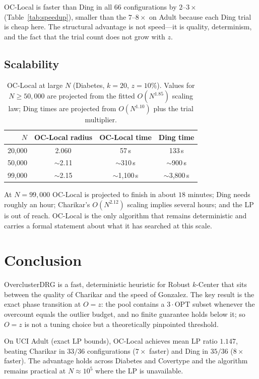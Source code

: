 \documentclass[twoside,leqno,twocolumn]{article}
\newcommand{\OPT}{\mathrm{OPT}}
\begin{document}
OC-Local is faster than Ding in all $66$ configurations by $2$--$3\times$
(Table~\ref{tab:speedup}), smaller than the $7$--$8\times$ on Adult
because each Ding trial is cheap here. The structural advantage is not
speed---it is quality, determinism, and the fact that the trial count
does not grow with $z$.

\subsection{Scalability}
\label{sec:scalability}

\begin{table}[t]
\caption{OC-Local at large $N$ (Diabetes, $k=20$, $z=10\%$).
Values for $N\ge50{,}000$ are projected from the fitted $O(N^{1.85})$
scaling law; Ding times are projected from $O(N^{1.10})$ plus the
trial multiplier.}
\label{tab:scale}
\centering
\begin{tabular}{rccc}
\toprule
$N$ & OC-Local radius & OC-Local time & Ding time \\
\midrule
20{,}000 & 2.060 & 57\,s  & 133\,s \\
50{,}000 & $\sim$2.11 & $\sim$310\,s & $\sim$900\,s \\
99{,}000 & $\sim$2.15 & $\sim$1{,}100\,s & $\sim$3{,}800\,s \\
\bottomrule
\end{tabular}
\end{table}

At $N=99{,}000$ OC-Local is projected to finish in about $18$ minutes;
Ding needs roughly an hour; Charikar's $O(N^{2.12})$ scaling implies
several hours; and the LP is out of reach. OC-Local is the only
algorithm that remains deterministic and carries a formal statement
about what it has searched at this scale.


\section{Conclusion}

OverclusterDRG is a fast, deterministic heuristic for Robust
$k$-Center that sits between the quality of Charikar and the speed of
Gonzalez. The key result is the exact phase transition at $O=z$: the
pool contains a $3\cdot\OPT$ subset whenever the overcount equals the
outlier budget, and no finite guarantee holds below it; so $O=z$ is
not a tuning choice but a theoretically pinpointed threshold.

On UCI Adult (exact LP bounds), OC-Local achieves mean LP ratio
$1.147$, beating Charikar in $33/36$ configurations ($7\times$ faster)
and Ding in $35/36$ ($8\times$ faster). The advantage holds across
Diabetes and Covertype and the algorithm remains practical at
$N\approx10^5$ where the LP is unavailable.
\end{document}
